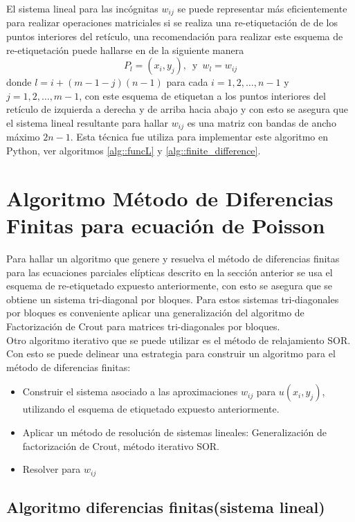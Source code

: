 \documentclass[a4paper]{article}
\begin{document}
El sistema lineal para las incógnitas $w_{ij}$ se puede representar más eficientemente para realizar operaciones matriciales si se realiza una re-etiquetación de de los puntos interiores del retículo, una recomendación para realizar este esquema de re-etiquetación puede hallarse en \cite{Varga} de la siguiente manera
\begin{equation}
P_l=(x_i,y_j), \,\,\, \text{y}\,\,\, w_l=w_{ij}
\end{equation}
donde $l=i+(m-1-j)(n-1)$ para cada $i=1,2,\hdots,n-1$ y $j=1,2,\hdots,m-1$, con este esquema de etiquetan a los puntos interiores del retículo de izquierda a derecha y de arriba hacia abajo y con esto se asegura que el sistema lineal resultante para hallar $w_{ij}$ es una matriz con bandas de ancho máximo $2n-1$. Esta técnica fue utiliza para implementar este algoritmo en Python, ver algoritmos \ref{alg::funcL} y \ref{alg::finite_difference}.



\section{Algoritmo Método de Diferencias Finitas para ecuación de Poisson}
Para hallar un algoritmo que genere y resuelva el método de diferencias finitas para las ecuaciones parciales elípticas descrito en la sección anterior se usa el esquema de re-etiquetado expuesto anteriormente, con esto se asegura que se obtiene un sistema tri-diagonal por bloques. Para estos sistemas tri-diagonales por bloques es conveniente aplicar una generalización del algoritmo de Factorización de Crout \cite{Varga} para matrices tri-diagonales por bloques.\\
Otro algoritmo iterativo que se puede utilizar es el método de relajamiento SOR. Con esto se puede delinear una estrategia para construir un algoritmo para el método de diferencias finitas:
\begin{itemize}
\item Construir el sistema asociado a las aproximaciones $w_{ij}$ para $u(x_i,y_j)$, utilizando el esquema de etiquetado expuesto anteriormente.
\item Aplicar un método de resolución de sistemas lineales: Generalización de factorización de Crout, método iterativo SOR.
\item Resolver para $w_{ij}$
\end{itemize}

\subsection{Algoritmo diferencias finitas(sistema lineal)}
\end{document}
